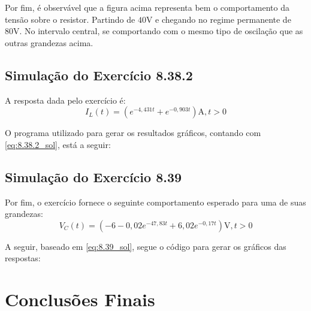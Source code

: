 \documentclass{report}
\let\oldsection\section
\renewcommand\section{\clearpage\oldsection}
\begin{document}
Por fim, é observável que a figura acima representa bem o comportamento da tensão sobre o resistor. Partindo de $ 40\text{V} $ e chegando no regime
permanente de $ 80 \text{V} $. No intervalo central, se comportando com o mesmo tipo de oscilação que as outras grandezas acima.

\subsection{Simulação do Exercício 8.38.2}
A resposta dada pelo exercício é:
$$ I_L(t) = \left(e^{-4,431t} + e^{-0,903t}\right)\text{A}, t > 0 $$

O programa utilizado para gerar os resultados gráficos, contando com \ref{eq:8.38.2_sol}, está a seguir:

\subsection{Simulação do Exercício 8.39}
Por fim, o exercício fornece o seguinte comportamento esperado para uma de suas grandezas:
$$ V_C(t) = \left(-6 -0,\!02e^{-47,83t} + 6,\!02e^{-0,17t}\right)\text{V}, t > 0 $$

A seguir, baseado em \ref{eq:8.39_sol}, segue o código para gerar os gráficos das respostas:

\section{Conclusões Finais}
\end{document}
